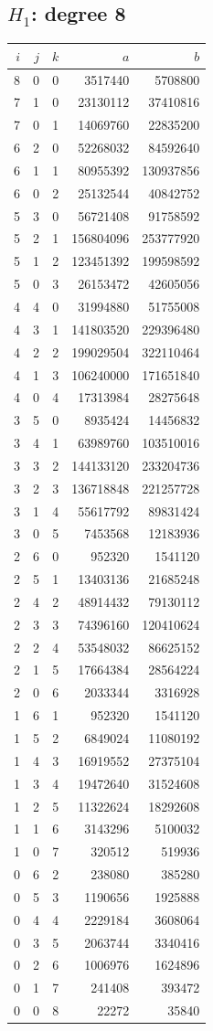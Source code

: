 \subsection{\texorpdfstring{$H_1$}{H1}: degree 8}
\begin{longtable}{rrr|rr}
$i$&$j$&$k$&$a$&$b$\\\hline\endhead
8&0&0&3517440&5708800\\
7&1&0&23130112&37410816\\
7&0&1&14069760&22835200\\
6&2&0&52268032&84592640\\
6&1&1&80955392&130937856\\
6&0&2&25132544&40842752\\
5&3&0&56721408&91758592\\
5&2&1&156804096&253777920\\
5&1&2&123451392&199598592\\
5&0&3&26153472&42605056\\
4&4&0&31994880&51755008\\
4&3&1&141803520&229396480\\
4&2&2&199029504&322110464\\
4&1&3&106240000&171651840\\
4&0&4&17313984&28275648\\
3&5&0&8935424&14456832\\
3&4&1&63989760&103510016\\
3&3&2&144133120&233204736\\
3&2&3&136718848&221257728\\
3&1&4&55617792&89831424\\
3&0&5&7453568&12183936\\
2&6&0&952320&1541120\\
2&5&1&13403136&21685248\\
2&4&2&48914432&79130112\\
2&3&3&74396160&120410624\\
2&2&4&53548032&86625152\\
2&1&5&17664384&28564224\\
2&0&6&2033344&3316928\\
1&6&1&952320&1541120\\
1&5&2&6849024&11080192\\
1&4&3&16919552&27375104\\
1&3&4&19472640&31524608\\
1&2&5&11322624&18292608\\
1&1&6&3143296&5100032\\
1&0&7&320512&519936\\
0&6&2&238080&385280\\
0&5&3&1190656&1925888\\
0&4&4&2229184&3608064\\
0&3&5&2063744&3340416\\
0&2&6&1006976&1624896\\
0&1&7&241408&393472\\
0&0&8&22272&35840\\
\end{longtable}
